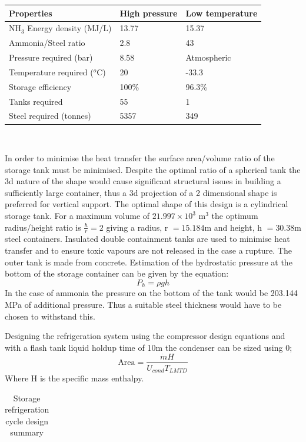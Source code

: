 \documentclass[11pt, a4paper]{article}
\begin{document}
{\begin{table}[!htbp]
\begin{center}
\begin{tabular}{ |p{5cm}||p{3cm}||p{3cm}|| }
			Properties & High pressure& Low temperature\\
			\hline
			NH$_3$ Energy density (MJ/L) & 13.77& 15.37\\
			Ammonia/Steel ratio & 2.8& 43\\
			Pressure required (bar) & 8.58 &Atmospheric\\
			Temperature required ($^o$C)& 20 &-33.3\\
			Storage efficiency&100\%&96.3\% \\
			
			Tanks required   &55&1 \\
			Steel required (tonnes)   &5357&349 \\
			
			
			\hline
		\end{tabular}
		\\
	
		
	\end{center}
	
\end{table}


In order to minimise the heat transfer the surface area/volume ratio of the storage tank must be minimised. Despite the optimal ratio of a spherical tank the 3d nature of the shape would cause significant structural issues in building a sufficiently large container, thus a 3d projection of a 2 dimensional shape is preferred for vertical support. The optimal shape of this design is a cylindrical storage tank. For a maximum volume of $21.997\times10^3$ m$^3$ the optimum radius/height ratio is $\frac{h}{r} = 2$ giving a radius, r $ = 15.184$m and height, h $ = 30.38$m steel containers. Insulated double containment tanks are used to minimise heat transfer and to ensure toxic vapours are not released in the case a rupture. The outer tank is made from concrete. Estimation of the hydrostatic pressure at the bottom of the storage container can be given by the equation:
\begin{equation}
P_h= \rho g h
\end{equation}
In the case of ammonia the pressure on the bottom of the tank would be 203.144 MPa of additional pressure. Thus a suitable steel thickness would have to be chosen to withstand this.

Designing the refrigeration system using the compressor design equations and with a flash tank liquid holdup time of 10m the condenser can be sized using \cite{Morgan2013}0;
\begin{equation}
	\text{Area} = \frac{\dot{m}H}{U_{cond}T_{LMTD}}
\end{equation}
Where H is the specific mass enthalpy.
\begin{table}[!htbp]
	\begin{center}
		\caption{Storage refrigeration cycle design summary}
		\begin{tabular}{ |c|c|c|c| }
			\hline
			

\end{tabular}
\end{center}
\end{table}}
\end{document}
